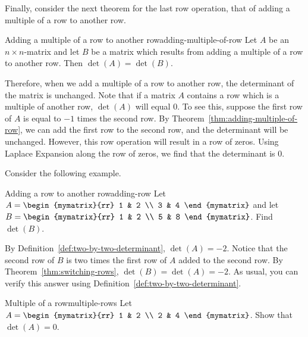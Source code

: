 Finally, consider the next theorem for the last row operation, that of adding a multiple of a row
to another row. 

\begin{theorem}{Adding a multiple of a row to another row}{adding-multiple-of-row}
Let $A$ be an $n\times n$-matrix and let $B$ be a matrix
which results from adding a multiple of a row to another row.
 Then $\det (A) =\det
(B)$.
\end{theorem}

Therefore, when we add a multiple of a row to another row, the determinant of the matrix is unchanged. 
Note that if a matrix $A$ contains a row which is a multiple of another row, $\det (A)$ will equal $0$. To see this,
suppose the first row of $A$ is equal to $-1$ times the second row. By Theorem~\ref{thm:adding-multiple-of-row}, we can 
add the first row to the second row, and the determinant will be unchanged. However, this row operation will result in a row of zeros.
Using Laplace Expansion along the row of zeros, we find that the determinant is $0$. 

Consider the following example.

\begin{example}{Adding a row to another row}{adding-row}
Let $A=\begin{mymatrix}{rr}
1 & 2 \\
3 & 4
\end{mymatrix} $ and let $B=\begin{mymatrix}{rr}
1 & 2 \\
5 & 8
\end{mymatrix}$. 
Find $\det (B)$.
\end{example}

\begin{solution}
By Definition~\ref{def:two-by-two-determinant}, $\det (A) = -2$. 
Notice that the second row of $B$ is two times the first row of $A$ added
to the second row. 
By Theorem~\ref{thm:switching-rows}, $\det (B) = \det (A)
=-2$.
As usual, you can verify this answer using Definition~\ref{def:two-by-two-determinant}.
\end{solution}

\begin{example}{Multiple of a row}{multiple-rows}
Let $A = \begin{mymatrix}{rr}
1 & 2 \\
2 & 4 
\end{mymatrix}$. Show that $\det (A) = 0$. 
\end{example}

